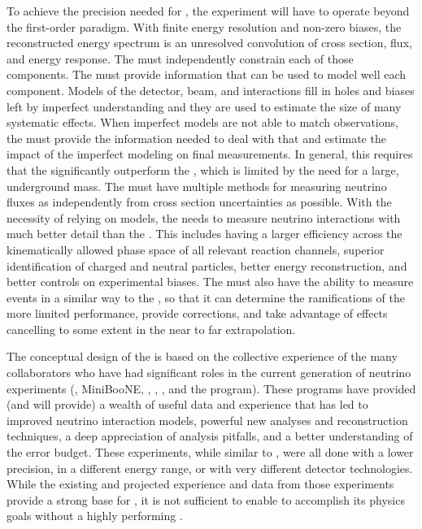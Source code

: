 To achieve the precision needed for , the experiment will have to operate beyond the first-order paradigm. With finite energy resolution and non-zero biases, the reconstructed energy spectrum is an unresolved convolution of cross section, flux, and energy response. The  must independently constrain each of those components.  The  must provide information that can be used to model well each component. Models of the detector, beam, and interactions fill in holes and biases left by imperfect understanding and they are used to estimate the size of many systematic effects.  When imperfect models are not able to match observations, the  must provide the information needed to deal with that and estimate the impact of the imperfect modeling on final measurements. In general, this requires that the  significantly outperform the , which is limited by the need for a large, underground mass. The  must have multiple methods for measuring neutrino fluxes as independently from cross section uncertainties as possible. With the necessity of relying on models, the  needs to measure neutrino interactions with much better detail than the . This includes having a larger efficiency across the kinematically allowed phase space of all relevant reaction channels, superior identification of charged and neutral particles, better energy reconstruction, and better controls on experimental biases. The  must also have the ability to measure events in a similar way to the , so that it can determine the ramifications of the more limited  performance, provide corrections, and take advantage of effects cancelling to some extent in the near to far extrapolation.

The conceptual design of the  is based on the collective experience of the many  collaborators who have had significant roles in the current generation of neutrino experiments (, MiniBooNE, , , , and the  program).  These programs have provided (and will provide) a wealth of useful data and experience that has led to improved neutrino interaction models, powerful new analyses and reconstruction techniques, a deep appreciation of analysis pitfalls, and a better understanding of the error budget. 
These experiments, while similar to , were all %
done with a lower precision, in a different energy range, or with very different detector technologies. While the existing and projected experience and data from those experiments provide a strong base for , it is not sufficient to enable  to accomplish its physics goals without a highly performing .  

